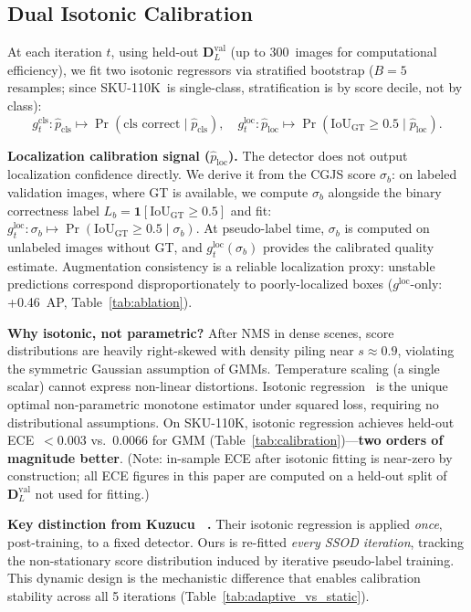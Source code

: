 \documentclass[10pt,twocolumn,letterpaper]{article}
\newcommand{\sku}{\textsc{SKU-110K}\xspace}
\begin{document}
\subsection{Dual Isotonic Calibration}
\label{sec:dual_calib}

At each iteration $t$, using held-out $\mathbf{D}_L^\text{val}$ (up to
300~images for computational efficiency), we fit two isotonic regressors via
stratified bootstrap ($B{=}5$ resamples; since \sku\ is single-class,
stratification is by score decile, not by class):
\begin{equation}
\label{eq:calibrators}
g_t^\text{cls}: \hat{p}_\text{cls} \mapsto \Pr(\text{cls correct}\mid\hat{p}_\text{cls}), \quad
g_t^\text{loc}: \hat{p}_\text{loc} \mapsto \Pr(\text{IoU}_{\text{GT}}{\ge}0.5\mid\hat{p}_\text{loc}).
\end{equation}

\textbf{Localization calibration signal ($\hat{p}_\text{loc}$).}
The detector does not output localization confidence directly. We derive it
from the CGJS score $\sigma_b$: on labeled validation images, where GT is
available, we compute $\sigma_b$ alongside the binary correctness label
$L_b{=}\mathbf{1}[\text{IoU}_\text{GT}{\ge}0.5]$ and fit:
$g_t^\text{loc}: \sigma_b \mapsto \Pr(\text{IoU}_\text{GT}\!{\ge}\!0.5\mid\sigma_b).$
At pseudo-label time, $\sigma_b$ is computed on unlabeled images without GT,
and $g_t^\text{loc}(\sigma_b)$ provides the calibrated quality estimate.
Augmentation consistency is a reliable localization proxy: unstable predictions
correspond disproportionately to poorly-localized boxes ($g^\text{loc}$-only: +0.46~AP,
Table~\ref{tab:ablation}).

\textbf{Why isotonic, not parametric?}
After NMS in dense scenes, score distributions are heavily right-skewed with
density piling near $s{\approx}0.9$, violating the symmetric Gaussian assumption
of GMMs. Temperature scaling (a single scalar) cannot express non-linear
distortions. Isotonic regression~\cite{ayer1955empirical} is the unique optimal
non-parametric monotone estimator under squared loss, requiring no distributional
assumptions. On \sku, isotonic regression achieves held-out ECE~${<}0.003$
vs.\ 0.0066 for GMM (Table~\ref{tab:calibration})---\textbf{two orders of
magnitude better}. (Note: in-sample ECE after isotonic fitting is
near-zero by construction; all ECE figures in this paper are computed on
a held-out split of $\mathbf{D}_L^\text{val}$ not used for fitting.)

\textbf{Key distinction from Kuzucu \etal~\cite{kuzucu2024calibration}.}
Their isotonic regression is applied \emph{once}, post-training, to a fixed
detector. Ours is re-fitted \emph{every SSOD iteration}, tracking the
non-stationary score distribution induced by iterative pseudo-label training.
This dynamic design is the mechanistic difference that enables calibration
stability across all 5 iterations (Table~\ref{tab:adaptive_vs_static}).
\end{document}
